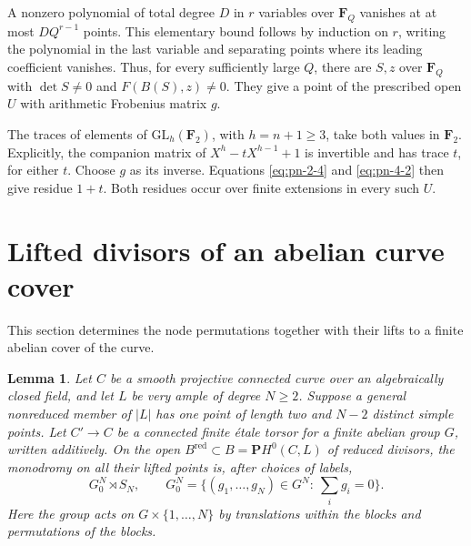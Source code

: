 \documentclass[11pt]{article}
\newtheorem{lemma}[theorem]{Lemma}
\begin{document}
A nonzero polynomial of total degree \(D\) in \(r\) variables over
\(\mathbf F_Q\) vanishes at at most \(D Q^{r-1}\) points. This elementary
bound follows by induction on \(r\), writing the polynomial in the last
variable and separating points where its leading coefficient vanishes.
Thus, for every sufficiently large \(Q\), there are \(S,z\) over
\(\mathbf F_Q\) with \(\det S\neq0\) and \(F(B(S),z)\neq0\).
They give a point of the prescribed open \(U\) with arithmetic Frobenius
matrix \(g\).

The traces of elements of \(\mathrm{GL}_h(\mathbf F_2)\), with \(h=n+1\geq3\),
take both values in \(\mathbf F_2\). Explicitly, the companion matrix of
\(X^h-tX^{h-1}+1\) is invertible and has trace \(t\), for either \(t\).
Choose \(g\) as its inverse. Equations \eqref{eq:pn-2-4} and \eqref{eq:pn-4-2} then give residue
\(1+t\). Both residues occur over finite extensions in every such \(U\).

\section{Lifted divisors of an abelian curve cover}\label{sec:plane-wreath}
This section determines the node permutations together with their lifts to a finite abelian cover of the curve.

\begin{lemma}\label{lem:plane-wreath}
Let $C$ be a smooth projective connected curve over an algebraically closed field, and let $L$ be very ample of degree $N\ge2$. Suppose a general nonreduced member of $|L|$ has one point of length two and $N-2$ distinct simple points. Let $C'\to C$ be a connected finite \'etale torsor for a finite abelian group $G$, written additively. On the open $B^{\mathrm{red}}\subset B=\mathbf P H^0(C,L)$ of reduced divisors, the monodromy on all their lifted points is, after choices of labels,
\[
 G_0^N\rtimes S_N,\qquad
 G_0^N=\{(g_1,\ldots,g_N)\in G^N:\ \textstyle\sum_i g_i=0\}.
\]
Here the group acts on $G\times\{1,\ldots,N\}$ by translations within the blocks and permutations of the blocks.
\end{lemma}
\end{document}
